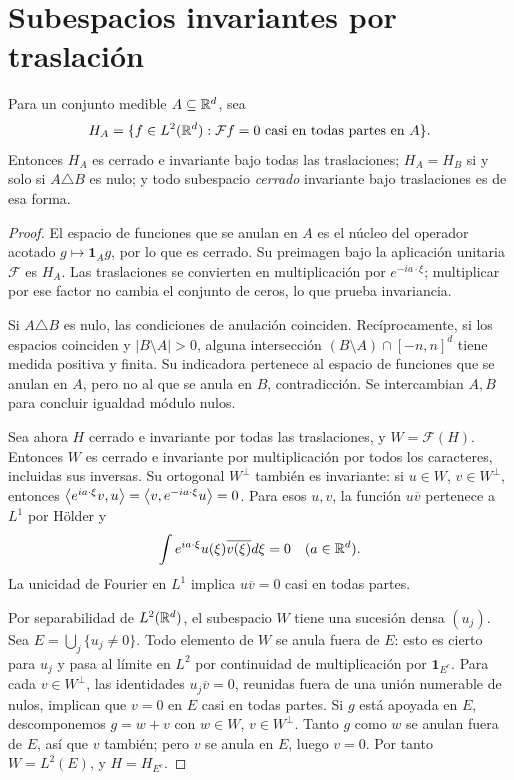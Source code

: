 \section{Subespacios invariantes por traslación}\label{lectura:v4-14}
\begin{teorema}\label{v4:subespacios-invariantes}
Para un conjunto medible $A\subseteq\mathbb R^d$, sea
\[
 H_A=\{f\in L^2(\mathbb R^d):\mathcal Ff=0\text{ casi en todas partes en }A\}.
\]
Entonces $H_A$ es cerrado e invariante bajo todas las traslaciones; $H_A=H_B$ si y solo si $A\triangle B$ es nulo; y todo subespacio \emph{cerrado} invariante bajo traslaciones es de esa forma.
\end{teorema}
\begin{proof}
El espacio de funciones que se anulan en $A$ es el núcleo del operador acotado $g\mapsto\mathbf1_Ag$, por lo que es cerrado. Su preimagen bajo la aplicación unitaria $\mathcal F$ es $H_A$. Las traslaciones se convierten en multiplicación por $e^{-ia\cdot\xi}$; multiplicar por ese factor no cambia el conjunto de ceros, lo que prueba invariancia.

Si $A\triangle B$ es nulo, las condiciones de anulación coinciden. Recíprocamente, si los espacios coinciden y $|B\setminus A|>0$, alguna intersección $(B\setminus A)\cap[-n,n]^d$ tiene medida positiva y finita. Su indicadora pertenece al espacio de funciones que se anulan en $A$, pero no al que se anula en $B$, contradicción. Se intercambian $A,B$ para concluir igualdad módulo nulos.

Sea ahora $H$ cerrado e invariante por todas las traslaciones, y $W=\mathcal F(H)$. Entonces $W$ es cerrado e invariante por multiplicación por todos los caracteres, incluidas sus inversas. Su ortogonal $W^\perp$ también es invariante: si $u\in W$, $v\in W^\perp$, entonces $\left\langle e^{ia\cdot\xi}v,u\right\rangle=\left\langle v,e^{-ia\cdot\xi}u\right\rangle=0$. Para esos $u,v$, la función $u\overline v$ pertenece a $L^1$ por Hölder y
\[
 \int e^{ia\cdot\xi}u(\xi)\overline{v(\xi)}d\xi=0\quad(a\in\mathbb R^d).
\]
La unicidad de Fourier en $L^1$ implica $u\overline v=0$ casi en todas partes.

Por separabilidad de $L^2(\mathbb R^d)$, el subespacio $W$ tiene una sucesión densa $(u_j)$. Sea $E=\bigcup_j\{u_j\ne0\}$. Todo elemento de $W$ se anula fuera de $E$: esto es cierto para $u_j$ y pasa al límite en $L^2$ por continuidad de multiplicación por $\mathbf1_{E^c}$. Para cada $v\in W^\perp$, las identidades $u_j\overline v=0$, reunidas fuera de una unión numerable de nulos, implican que $v=0$ en $E$ casi en todas partes. Si $g$ está apoyada en $E$, descomponemos $g=w+v$ con $w\in W$, $v\in W^\perp$. Tanto $g$ como $w$ se anulan fuera de $E$, así que $v$ también; pero $v$ se anula en $E$, luego $v=0$. Por tanto $W=L^2(E)$, y $H=H_{E^c}$.
\end{proof}
